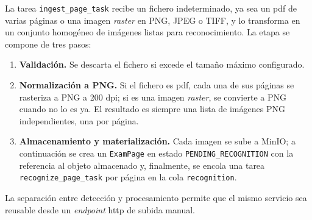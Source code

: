 La tarea \texttt{ingest\_page\_task} recibe un fichero indeterminado, ya
sea un \acs{pdf} de varias páginas o una imagen \textit{raster} en PNG,
JPEG o TIFF, y lo transforma en un conjunto homogéneo de imágenes listas
para reconocimiento. La etapa se compone de tres pasos:

\begin{enumerate}
  \item \textbf{Validación.} Se descarta el fichero si excede el tamaño
  máximo configurado.

  \item \textbf{Normalización a PNG.} Si el fichero es \acs{pdf}, cada una
  de sus páginas se rasteriza a PNG a 200 dpi; si es una imagen
  \textit{raster}, se convierte a PNG cuando no lo es ya. El resultado es
  siempre una lista de imágenes PNG independientes, una por página.

  \item \textbf{Almacenamiento y materialización.} Cada imagen se sube a
  MinIO; a continuación se crea un \texttt{ExamPage} en estado
  \texttt{PENDING\_RECOGNITION} con la referencia al objeto almacenado y,
  finalmente, se encola una tarea \texttt{recognize\_page\_task} por
  página en la cola \texttt{recognition}.
\end{enumerate}

La separación entre detección y procesamiento permite que el mismo
servicio sea reusable desde un \textit{endpoint} \acs{http} de subida
manual.
